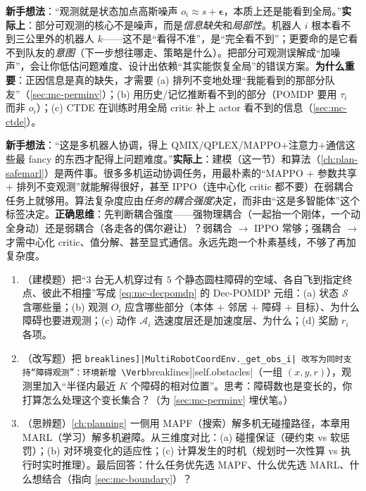 \begin{pitfall}
\textbf{新手想法}：“观测就是状态加点高斯噪声 $o_i\approx s+\boldsymbol{\epsilon}$，本质上还是能看到全局。”\textbf{实际上}：部分可观测的核心不是噪声，而是\emph{信息缺失}和\emph{局部性}。机器人 $i$ 根本看不到三公里外的机器人 $k$——这不是“看得不准”，是“完全看不到”；更要命的是它看不到队友的\emph{意图}（下一步想往哪走、策略是什么）。把部分可观测误解成“加噪声”，会让你低估问题难度、设计出依赖“其实能恢复全局”的错误方案。\textbf{为什么重要}：正因信息是真的缺失，才需要 (a) 排列不变地处理“我能看到的那部分队友”（\cref{sec:mc-perminv}）；(b) 用历史/记忆推断看不到的部分（POMDP 要用 $\tau_i$ 而非 $o_i$）；(c) CTDE 在训练时用全局 critic 补上 actor 看不到的信息（\cref{sec:mc-ctde}）。
\end{pitfall}

\begin{pitfall}
\textbf{新手想法}：“这是多机器人协调，得上 QMIX/QPLEX/MAPPO$+$注意力$+$通信这些最 fancy 的东西才配得上问题难度。”\textbf{实际上}：建模（这一节）和算法（\cref{ch:plan-safemarl}）是两件事。很多多机运动协调任务，用最朴素的“MAPPO $+$ 参数共享 $+$ 排列不变观测”就能解得很好，甚至 IPPO（连中心化 critic 都不要）在弱耦合任务上就够用。算法复杂度应由\emph{任务的耦合强度}决定，而非由“这是多智能体”这个标签决定。\textbf{正确思维}：先判断耦合强度——强物理耦合（一起抬一个刚体，一个动全身动）还是弱耦合（各走各的偶尔避让）？弱耦合 $\to$ IPPO 常够；强耦合 $\to$ 才需中心化 critic、值分解、甚至显式通信。永远先跑一个朴素基线，不够了再加复杂度。
\end{pitfall}

\begin{practice}
\begin{enumerate}
  \item （建模题）把“$3$ 台无人机穿过有 $5$ 个静态圆柱障碍的空域、各自飞到指定终点、彼此不相撞”写成 \cref{eq:mc-decpomdp} 的 Dec-POMDP 元组：(a) 状态 $\mathcal{S}$ 含哪些量；(b) 观测 $O_i$ 应含哪些部分（本体 $+$ 邻居 $+$ 障碍 $+$ 目标）、为什么障碍也要进观测；(c) 动作 $\mathcal{A}_i$ 选速度层还是加速度层、为什么；(d) 奖励 $r_i$ 各项。
  \item （改写题）把 \Verb[breaklines]|MultiRobotCoordEnv._get_obs_i| 改写为同时支持“障碍观测”：环境新增 \Verb[breaklines]|self.obstacles|（一组 $(x,y,r)$），观测里加入“半径内最近 $K$ 个障碍的相对位置”。思考：障碍数也是变长的，你打算怎么处理这个变长集合？（为 \cref{sec:mc-perminv} 埋伏笔。）
  \item （思辨题）\cref{ch:planning} 一侧用 MAPF（搜索）解多机无碰撞路径，本章用 MARL（学习）解多机避障。从三维度对比：(a) 碰撞保证（硬约束 vs 软惩罚）；(b) 对环境变化的适应性；(c) 计算发生的时机（规划时一次性算 vs 执行时实时推理）。最后回答：什么任务优先选 MAPF、什么优先选 MARL、什么想结合（指向 \cref{sec:mc-boundary}）？
\end{enumerate}
\end{practice}

